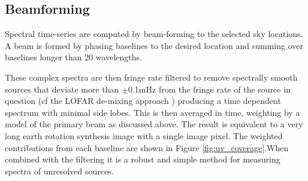 \documentclass[preprint]{aastex}
\begin{document}


\subsection{Beamforming}

Spectral time-series are computed by beam-forming to the selected sky
locations. A beam is formed by phasing baselines to the desired location and
summing over baselines longer than 20 wavelengths.




 These complex spectra are then fringe rate filtered to remove spectrally
smooth sources that deviate more than $\pm$0.1mHz from the fringe rate of the source in question
 \citep{Parsons:2009p7859} (cf the LOFAR
de-mixing approach \cite{Offringa:2012p9691})  producing a time dependent
spectrum with minimal side lobes. This is then averaged in time,  weighting by a model of the primary
beam as discussed above.
The result is equivalent to
a very long earth rotation synthesis image with a single image pixel. The weighted
contributions from each baseline are shown in Figure \ref{fig:uv_coverage}.When
combined with the filtering it is a robust and simple method for measuring
spectra of unresolved sources. 
\end{document}
